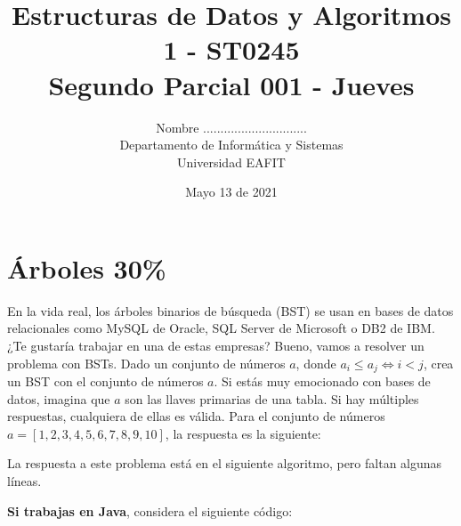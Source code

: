 \documentclass[10 pt]{article}
\title{\textbf {Estructuras de Datos y Algoritmos 1 - ST0245\\Segundo Parcial 001 - Jueves}}
\author{Nombre ..............................\\
		Departamento de Informática y Sistemas\\
		Universidad EAFIT\\}
\date{Mayo 13 de 2021}
\begin{document}
\lstset{language=Java,frame=none, breaklines=true, numbers = left, stepnumber = 1, xleftmargin=5.0ex, showstringspaces=false, showspaces=false }
\lstset{language=Python,frame=none, breaklines=true, numbers = left, stepnumber = 1, xleftmargin=5.0ex, showstringspaces=false,showspaces=false }
\maketitle

\section{Árboles 30\%}
En la vida real, los árboles binarios de búsqueda (BST) se usan en bases de datos relacionales como MySQL de Oracle, SQL Server de Microsoft o DB2 de IBM. 
¿Te gustaría trabajar en una de estas empresas? Bueno, vamos a resolver un problema con BSTs. 
 Dado un conjunto de números $a$, donde $a_i \leq a_j \iff i < j$, crea un BST con el conjunto de números $a$. Si estás muy emocionado con bases de datos, imagina que $a$ son las llaves primarias de una tabla. Si hay múltiples respuestas, cualquiera de ellas es válida. Para el conjunto de números $a = [1, 2, 3, 4, 5, 6, 7 , 8, 9, 10]$, la respuesta es la siguiente:
\begin{center}
  \end{center}

La respuesta a este problema está en el siguiente algoritmo, pero faltan algunas líneas.

\hspace{1 cm}

\textbf{Si trabajas en Java}, considera el siguiente código:
\end{document}
